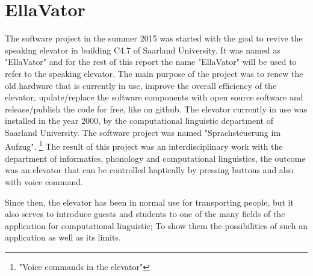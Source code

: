 \documentclass[a4paper, 12pt]{article}
\begin{document}


\pagestyle{empty}

\pagestyle{plain}
\setcounter{page}{1}
\tableofcontents
\cleardoublepage

\section{EllaVator}

The software project in the summer 2015 was started with the goal to revive the speaking elevator in building C4.7 
of Saarland University. It was named as "EllaVator" and for the rest of this report the name "EllaVator" will be used
to refer to the speaking elevator. The main purpose of the project was to renew the old hardware that is currently
in use, improve the overall efficiency of the elevator, update/replace the software components with open source software and
release/publish the code for free, like on github.
\newline
The elevator currently in use was installed in the year 2000, by the
computational linguistic department of Saarland University. The software
project was named "Sprachsteuerung im Aufzug". \footnote {"Voice commands in the elevator"}
The result of this project was an interdisciplinary work with the department of informatics, phonology and computational linguistics, the outcome was an elevator that can be controlled haptically by pressing buttons and also with voice command. ~\cite{SprachsteuerungimAufzug} \newline

Since then, the elevator has been in normal use for transporting people, but it also serves to introduce guests and students to one of the many fields of the application for computational linguistic;
To show them the possibilities of such an application as well as its limits. \newline
\end{document}
